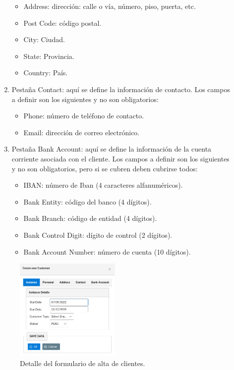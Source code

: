 \begin{description}
\begin{enumerate}
	\begin{itemize}
	\item Address: dirección: calle o vía, número, piso, puerta, etc.
	\item Post Code: código postal.
	\item City: Ciudad.
	\item State: Provincia.
	\item Country: País.
	\end{itemize}
\item Pestaña Contact: aquí se define la información de contacto. Los campos a definir son los siguientes y no son obligatorios:
	\begin{itemize}
	\item Phone: número de teléfono de contacto.
	\item Email: dirección de correo electrónico.
	\end{itemize}
\item Pestaña Bank Account: aquí se define la información de la cuenta corriente asociada con el cliente. Los campos a definir son los siguientes y no son obligatorios, pero si se cubren deben cubrirse todos:
	\begin{itemize}
	\item IBAN: número de Iban (4 caracteres alfanuméricos).
	\item Bank Entity: código del banco (4 dígitos).
	\item Bank Branch: código de entidad (4 dígitos).
	\item Bank Control Digit: dígito de control (2 dígitos).
	\item Bank Account Number: número de cuenta (10 dígitos).	
	\end{itemize}	
\end{enumerate}


\begin{figure}[H]
  \centering
  \includegraphics[width=0.50\textwidth]{imaxes/formulario-alta-cliente.png}
  \caption{Detalle del formulario de alta de clientes.}
  \label{fig:formulario-alta-cliente}
\end{figure}


\end{description}
